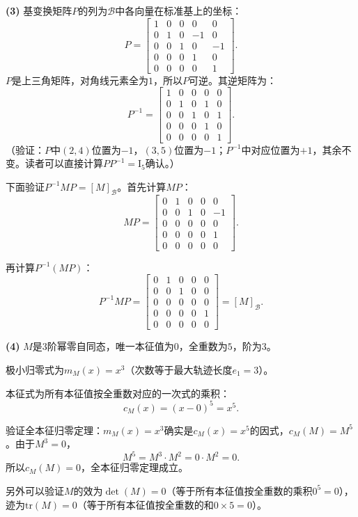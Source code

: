 \documentclass[12pt,UTF8]{ctexbook}
\begin{document}
\begin{so}
\textbf{(3)} 基变换矩阵$P$的列为$\mathcal{B}$中各向量在标准基上的坐标：
$$
P = \begin{bmatrix}
1 & 0 & 0 & 0 & 0 \\
0 & 1 & 0 & -1 & 0 \\
0 & 0 & 1 & 0 & -1 \\
0 & 0 & 0 & 1 & 0 \\
0 & 0 & 0 & 0 & 1
\end{bmatrix}.
$$
$P$是上三角矩阵，对角线元素全为$1$，所以$P$可逆。其逆矩阵为：
$$
P^{-1} = \begin{bmatrix}
1 & 0 & 0 & 0 & 0 \\
0 & 1 & 0 & 1 & 0 \\
0 & 0 & 1 & 0 & 1 \\
0 & 0 & 0 & 1 & 0 \\
0 & 0 & 0 & 0 & 1
\end{bmatrix}.
$$
（验证：$P$中$(2,4)$位置为$-1$，$(3,5)$位置为$-1$；$P^{-1}$中对应位置为$+1$，其余不变。读者可以直接计算$PP^{-1}=\mathrm{I}_5$确认。）

下面验证$P^{-1}MP = [M]_{\mathcal{B}}$。首先计算$MP$：
$$
MP = \begin{bmatrix}
0 & 1 & 0 & 0 & 0 \\
0 & 0 & 1 & 0 & -1 \\
0 & 0 & 0 & 0 & 0 \\
0 & 0 & 0 & 0 & 1 \\
0 & 0 & 0 & 0 & 0
\end{bmatrix}.
$$

再计算$P^{-1}(MP)$：
$$
P^{-1}MP = \begin{bmatrix}
0 & 1 & 0 & 0 & 0 \\
0 & 0 & 1 & 0 & 0 \\
0 & 0 & 0 & 0 & 0 \\
0 & 0 & 0 & 0 & 1 \\
0 & 0 & 0 & 0 & 0
\end{bmatrix} = [M]_{\mathcal{B}}. 
$$

\textbf{(4)} $M$是$3$阶幂零自同态，唯一本征值为$0$，全重数为$5$，阶为$3$。

极小归零式为$m_M(x) = x^3$（次数等于最大轨迹长度$e_1 = 3$）。

本征式为所有本征值按全重数对应的一次式的乘积：
$$c_M(x) = (x - 0)^5 = x^5.$$

验证全本征归零定理：$m_M(x) = x^3$确实是$c_M(x) = x^5$的因式，$c_M(M) = M^5$。由于$M^3 = 0$，
$$M^5 = M^3 \cdot M^2 = 0 \cdot M^2 = 0.$$
所以$c_M(M) = 0$，全本征归零定理成立。

另外可以验证$M$的效为$\det(M) = 0$（等于所有本征值按全重数的乘积$0^5 = 0$），迹为$\mathrm{tr}(M) = 0$（等于所有本征值按全重数的和$0 \times 5 = 0$）。
\end{so}
\end{document}
